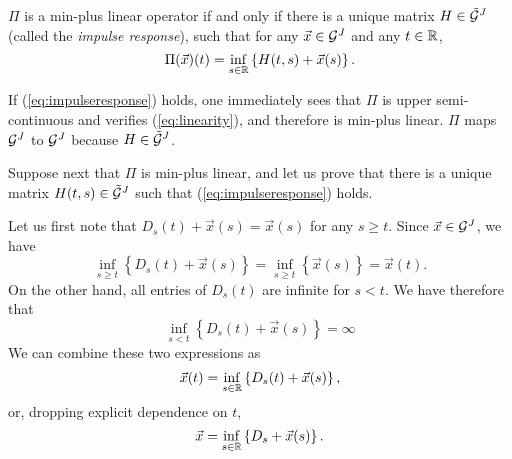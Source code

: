 \begin{theorem}
 $\Pi$ is a min-plus linear operator
if and only if there is a unique matrix $H \in \tilde{\mathcal G}^J$
(called the {\em impulse response}), such that for any $\vec{x}
\in \mathcal G^J$ and any $t \in \mathbb{R}$,
\begin{equation}
\mylabel{eq:impulseresponse}
\Pi(\vec{x})(t) = \inf_{s \in \Reals} \left\{ H(t,s) + \vec{x}(s) \right\}.
\end{equation}



\end{theorem}

\pr If (\ref{eq:impulseresponse}) holds, one immediately sees that
$\Pi$ is upper semi-continuous and verifies (\ref{eq:linearity}),
and therefore is min-plus linear. $\Pi$ maps $\mathcal G^J$ to
$\mathcal G^J$ because $H\in  \tilde{\mathcal G}^J$.

Suppose next that $\Pi$ is min-plus linear, and let us prove that there is a unique matrix $H(t,s) \in \tilde{\mathcal G}^J$ such that (\ref{eq:impulseresponse}) holds.

Let us first note that $D_s (t) + \vec{x}(s)= \vec{x}(s)$ for any $s \geq t$. Since $\vec{x} \in \mathcal G^J$, we have
$$ \inf_{s \geq t}  \left\{ D_s (t) + \vec{x}(s) \right\} = \inf_{s \geq t}  \left\{ \vec{x}(s) \right\} = \vec{x}(t). $$
On the other hand, all entries of $D_s (t)$ are infinite for $s < t$.  We have therefore that
$$ \inf_{s < t}  \left\{ D_s (t) + \vec{x}(s) \right\} = \infty $$
We can combine these two expressions as
$$ \vec{x}(t) = \inf_{s \in \mathbb{R}}  \left\{ D_s(t) + \vec{x}(s) \right\}, $$
or, dropping  explicit dependence on $t$,
$$ \vec{x} = \inf_{s \in \mathbb{R}}  \left\{ D_s + \vec{x}(s) \right\}. $$

